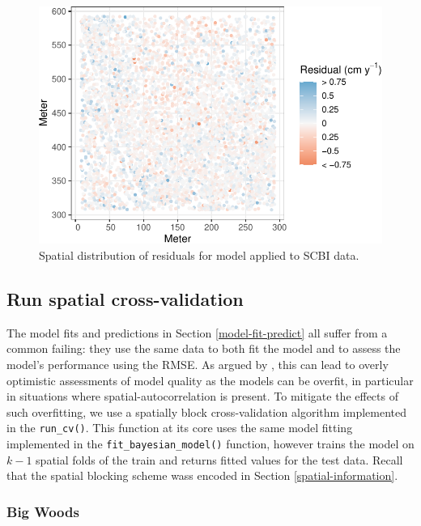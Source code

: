 \documentclass[12pt]{article}
\begin{document}
\begin{figure}

{\centering \includegraphics[width=0.8\linewidth]{Figures/scbi-model-residuals-2-1} 

}

\caption{Spatial distribution of residuals for model applied to SCBI data.}\label{fig:scbi-model-residuals-2}
\end{figure}

\hypertarget{run-spatial-cross-validation}{%
\subsection{Run spatial
cross-validation}\label{run-spatial-cross-validation}}

The model fits and predictions in Section \ref{model-fit-predict} all
suffer from a common failing: they use the same data to both fit the
model and to assess the model's performance using the RMSE. As argued by
\citet{roberts_cross-validation_2017}, this can lead to overly
optimistic assessments of model quality as the models can be overfit, in
particular in situations where spatial-autocorrelation is present. To
mitigate the effects of such overfitting, we use a spatially block
cross-validation algorithm implemented in the \texttt{run\_cv()}. This
function at its core uses the same model fitting implemented in the
\texttt{fit\_bayesian\_model()} function, however trains the model on
\(k-1\) spatial folds of the train and returns fitted values for the
test data. Recall that the spatial blocking scheme wass encoded in
Section \ref{spatial-information}.

\hypertarget{big-woods-5}{%
\subsubsection{Big Woods}\label{big-woods-5}}
\end{document}
